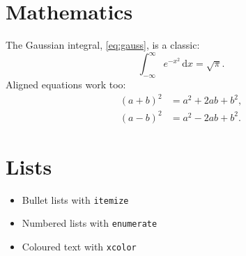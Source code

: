 \documentclass[11pt,a4paper]{article}
\begin{document}
\section{Mathematics}
The Gaussian integral, \cref{eq:gauss}, is a classic:
\begin{equation}
  \int_{-\infty}^{\infty} e^{-x^2}\,\mathrm{d}x = \sqrt{\pi}.
  \label{eq:gauss}
\end{equation}
Aligned equations work too:
\begin{align}
  (a+b)^2 &= a^2 + 2ab + b^2, \label{eq:binom1}\\
  (a-b)^2 &= a^2 - 2ab + b^2. \label{eq:binom2}
\end{align}

\section{Lists}
\begin{itemize}
  \item Bullet lists with \texttt{itemize}
  \item Numbered lists with \texttt{enumerate}
  \item \textcolor{blue!60!black}{Coloured text} with \texttt{xcolor}
\end{itemize}
\end{document}
